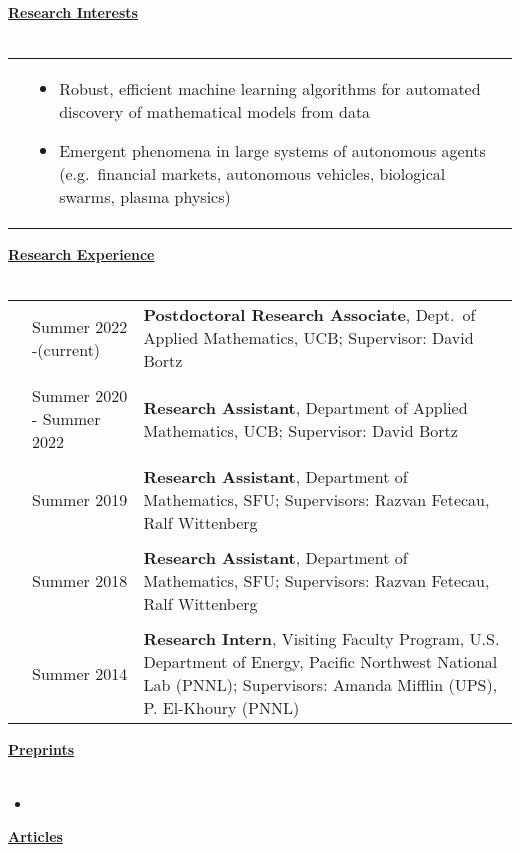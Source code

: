 \documentclass[letterpaper,11pt,oneside]{article}
\newcommand{\headr}[1]{\vspace{10pt}\uline{\Large{\textbf{#1}} \hfill } \\ \vspace{-10pt}\\}
\begin{document}
\headr{Research Interests}
%
\begin{tabular}{@{} p{0.01cm} p{15cm}}
&\begin{itemize}
\item Robust, efficient machine learning algorithms for automated discovery of mathematical models from data
\item Emergent phenomena in large systems of autonomous agents (e.g.\ financial markets, autonomous vehicles, biological swarms, plasma physics) 
\end{itemize}
\end{tabular}

\headr{Research Experience}

\begin{tabular}{@{} p{0.01cm} p{2.5cm} p{12cm}}
& Summer 2022 -\newline (current)  & 
\textbf{Postdoctoral Research Associate}, Dept.\ of Applied Mathematics, UCB;
Supervisor: David Bortz \\
& & \\
& Summer 2020 - \newline Summer 2022  & 
\textbf{Research Assistant}, Department of Applied Mathematics, UCB; \newline
Supervisor: David Bortz \\
&     & \\
& Summer 2019  & 
\textbf{Research Assistant}, Department of Mathematics, SFU;
\newline Supervisors: Razvan Fetecau, Ralf Wittenberg \\
&     & \\
& Summer 2018  & 
\textbf{Research Assistant}, Department of Mathematics, SFU;
\newline Supervisors: Razvan Fetecau, Ralf Wittenberg \\
&     & \\
& Summer 2014  & 
\textbf{Research Intern},  Visiting Faculty Program, U.S. Department of Energy, Pacific Northwest National Lab (PNNL);
\newline Supervisors: Amanda Mifflin (UPS), P. El-Khoury (PNNL) 
\end{tabular}




\headr{Preprints}

\begin{itemize}
\item {}
\end{itemize}
\newpage
\headr{Articles}
\end{document}
